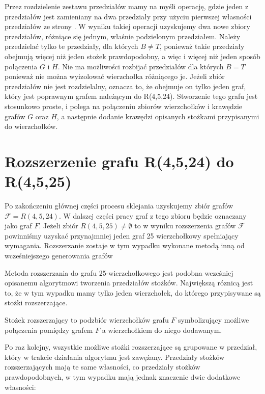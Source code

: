 Przez rozdzielenie zestawu przedziałów mamy na myśli operację, gdzie jeden z przedziałów jest zamieniany na dwa przedziały przy użyciu pierwszej własności przedziałów ze strony \pageref{przedzialZaleznosc}. W wyniku takiej operacji uzyskujemy dwa nowe zbiory przedziałów, różniące się jednym, właśnie podzielonym przedziałem. Należy przedzielać tylko te przedziały, dla których $B \neq T$, ponieważ takie przedziały obejmują więcej niż jeden stożek prawdopodobny, a więc i więcej niż jeden sposób połączenia $G$ i $H$. Nie ma możliwości rozbijać przedziałów dla których $B = T$ ponieważ nie można wyizolować wierzchołka różniącego je. Jeżeli zbiór przedziałów nie jest rozdzielalny, oznacza to, że obejmuje on tylko jeden graf, który jest poprawnym grafem należącym do R(4,5,24). Stworzenie tego grafu jest stosunkowo proste, i polega na połączeniu zbiorów wierzchołków i krawędzie grafów $G$ oraz $H$, a następnie dodanie krawędzi opisanych stożkami przypisanymi do wierzchołków.

\section{Rozszerzenie grafu R(4,5,24) do R(4,5,25)}

Po zakończeniu głównej części procesu sklejania uzyskujemy zbiór grafów $\mathcal{F} = R(4,5,24)$. W dalszej części pracy graf z tego zbioru będzie oznaczany jako graf $F$. Jeżeli zbiór $R(4,5,25) \neq \emptyset$ to w wyniku rozszerzenia grafów $\mathcal{F}$ powinniśmy uzyskać przynajmniej jeden graf 25 wierzchołkowy spełniający wymagania. 
Rozszerzanie zostaje w tym wypadku wykonane metodą inną od wcześniejszego generowania grafów

Metoda rozszerzania do grafu 25-wierzchołkowego jest podobna wcześniej opisanemu algorytmowi tworzenia przedziałów stożków. Największą róznicą jest to, że w tym wypadku mamy tylko jeden wierzchołek, do którego przypisywane są stożki rozszerzające.
\begin{definition}
  Stożek rozszerzający to podzbiór wierzchołków grafu $F$ symbolizujący możliwe połączenia pomiędzy grafem $F$ a wierzchołkiem do niego dodawanym.
\end{definition}

Po raz kolejny, wszystkie możliwe stożki rozszerzające są grupowane w przedział, który w trakcie działania algorytmu jest zawężany. Przedziały stożków rozszerzających mają te same własności, co przedziały stożków prawdopodobnych, w tym wypadku mają jednak znaczenie dwie dodatkowe własności:


